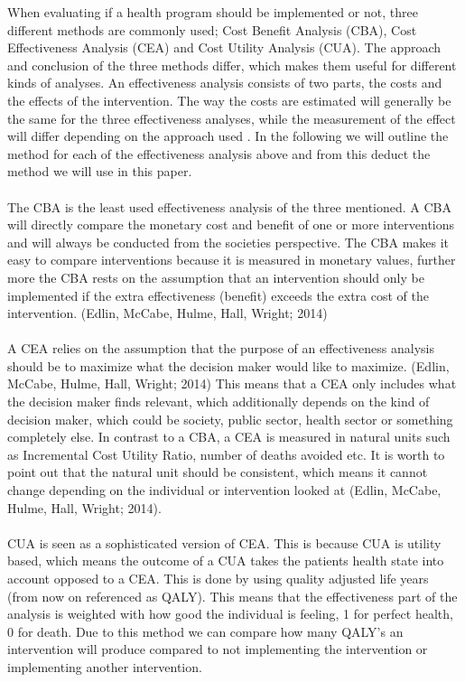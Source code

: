 \documentclass[a4paper,12pt]{article}
\begin{document}
When evaluating if a health program should be implemented or not, three different methods are commonly used; Cost Benefit Analysis (CBA), Cost Effectiveness Analysis (CEA) and Cost Utility Analysis (CUA). The approach and conclusion of the three methods differ, which makes them useful for different kinds of analyses. An effectiveness analysis consists of two parts, the costs and the effects of the intervention. The way the costs are estimated will generally be the same for the three effectiveness analyses, while the measurement of the effect will differ depending on the approach used \cite{Christiansen2010}. In the following we will outline the method for each of the effectiveness analysis above and from this deduct the method we will use in this paper.  
\\\\
The CBA is the least used effectiveness analysis of the three mentioned. A CBA will directly compare the monetary cost and benefit of one or more interventions and will always be conducted from the societies perspective. The CBA makes it easy to compare interventions because it is measured in monetary values, further more the CBA rests on the assumption that an intervention should only be implemented if the extra effectiveness (benefit) exceeds the extra cost of the intervention. (Edlin, McCabe, Hulme, Hall, Wright; 2014)
\\\\
A CEA relies on the assumption that the purpose of an effectiveness analysis should be to maximize what the decision maker would like to maximize. (Edlin, McCabe, Hulme, Hall, Wright; 2014) This means that a CEA only includes what the decision maker finds relevant, which additionally depends on the kind of decision maker, which could be society, public sector, health sector or something completely else. In contrast to a CBA, a CEA is measured in natural units such as Incremental Cost Utility Ratio, number of deaths avoided etc. It is worth to point out that the natural unit should be consistent, which means it cannot change depending on the individual or intervention looked at (Edlin, McCabe, Hulme, Hall, Wright; 2014). 
\\\\
CUA is seen as a sophisticated version of CEA. This is because CUA is utility based, which means the outcome of a CUA takes the patients health state into account opposed to a CEA. This is done by using quality adjusted life years (from now on referenced as QALY). This means that the effectiveness part of the analysis is weighted with how good the individual is feeling, 1 for perfect health, 0 for death. Due to this method we can compare how many QALY’s an intervention will produce compared to not implementing the intervention or implementing another intervention. 
\end{document}
